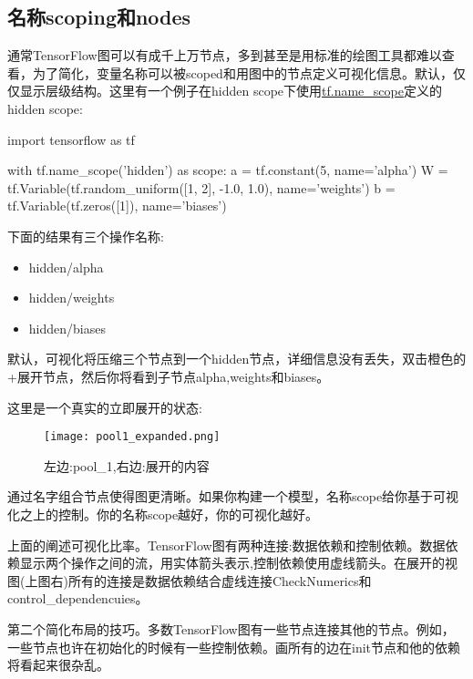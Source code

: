 \subsection{名称scoping和nodes}
通常TensorFlow图可以有成千上万节点，多到甚至是用标准的绘图工具都难以查看，为了简化，变量名称可以被scoped和用图中的节点定义可视化信息。默认，仅仅显示层级结构。这里有一个例子在hidden scope下使用\href{https://www.tensorflow.org/api_docs/python/tf/name_scope}{tf.name\_scope}定义的hidden scope:
\begin{pythoncode}
import tensorflow as tf

with tf.name_scope('hidden') as scope:
  a = tf.constant(5, name='alpha')
  W = tf.Variable(tf.random_uniform([1, 2], -1.0, 1.0), name='weights')
  b = tf.Variable(tf.zeros([1]), name='biases')
\end{pythoncode}
下面的结果有三个操作名称:
\begin{itemize}
\item hidden/alpha
\item hidden/weights
\item hidden/biases
\end{itemize}
默认，可视化将压缩三个节点到一个hidden节点，详细信息没有丢失，双击橙色的+展开节点，然后你将看到子节点alpha,weights和biases。

这里是一个真实的立即展开的状态:
\begin{figure}[H]
\centering
\texttt{[image: pool1\_expanded.png]}
\caption{左边:pool\_1,右边:展开的内容}
\end{figure}
通过名字组合节点使得图更清晰。如果你构建一个模型，名称scope给你基于可视化之上的控制。你的名称scope越好，你的可视化越好。

上面的阐述可视化比率。TensorFlow图有两种连接:数据依赖和控制依赖。数据依赖显示两个操作之间的流，用实体箭头表示,控制依赖使用虚线箭头。在展开的视图(上图右)所有的连接是数据依赖结合虚线连接CheckNumerics和control\_dependencuies。

第二个简化布局的技巧。多数TensorFlow图有一些节点连接其他的节点。例如，一些节点也许在初始化的时候有一些控制依赖。画所有的边在init节点和他的依赖将看起来很杂乱。

